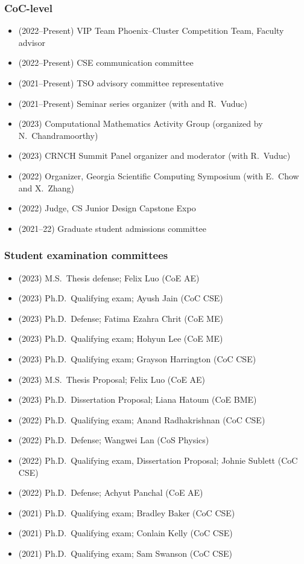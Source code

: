 \subsubsection{CoC-level}

\begin{itemize}
    \item (2022--Present) VIP Team Phoenix--Cluster Competition Team, Faculty advisor
    \item (2022--Present) CSE communication committee
    \item (2021--Present) TSO advisory committee representative
    \item (2021--Present) Seminar series organizer (with \Florian and R.\ Vuduc)
    \item (2023) Computational Mathematics Activity Group (organized by N.\ Chandramoorthy)
    \item (2023) CRNCH Summit Panel organizer and moderator (with R.\ Vuduc)
    \item (2022) Organizer, Georgia Scientific Computing Symposium (with E.\ Chow and X.\ Zhang)
    \item (2022) Judge, CS Junior Design Capstone Expo
    \item (2021--22) Graduate student admissions committee
\end{itemize}

\subsubsection{Student examination committees}

\begin{itemize}
    \item (2023) M.S.\ Thesis defense; Felix Luo (CoE AE)
    \item (2023) Ph.D.\ Qualifying exam; Ayush Jain (CoC CSE)
    \item (2023) Ph.D.\ Defense; Fatima Ezahra Chrit (CoE ME)
    \item (2023) Ph.D.\ Qualifying exam; Hohyun Lee (CoE ME)
    \item (2023) Ph.D.\ Qualifying exam; Grayson Harrington (CoC CSE)
    \item (2023) M.S.\ Thesis Proposal; Felix Luo (CoE AE)
    \item (2023) Ph.D.\ Dissertation Proposal; Liana Hatoum (CoE BME)
    \item (2022) Ph.D.\ Qualifying exam; Anand Radhakrishnan (CoC CSE)
    \item (2022) Ph.D.\ Defense; Wangwei Lan (CoS Physics)
    \item (2022) Ph.D.\ Qualifying exam, Dissertation Proposal; Johnie Sublett (CoC CSE)
    \item (2022) Ph.D.\ Defense; Achyut Panchal (CoE AE)
    \item (2021) Ph.D.\ Qualifying exam; Bradley Baker (CoC CSE)
    \item (2021) Ph.D.\ Qualifying exam; Conlain Kelly (CoC CSE)
    \item (2021) Ph.D.\ Qualifying exam; Sam Swanson (CoC CSE)
\end{itemize}

